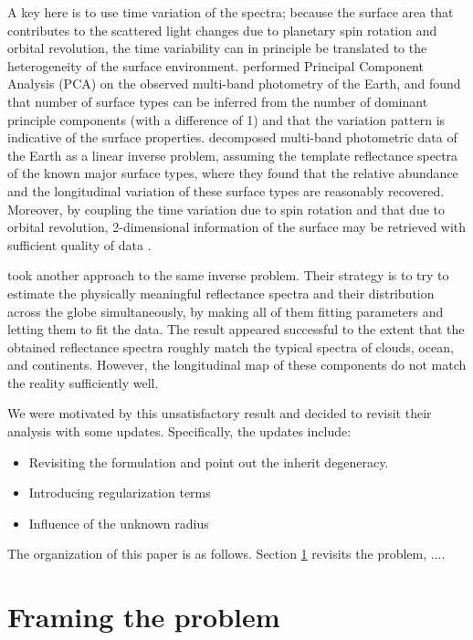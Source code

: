 \documentclass[iop,numberedappendix,apj,]{emulateapj}
\begin{document}
A key here is to use time variation of the spectra; because the surface area that contributes to the scattered light changes due to planetary spin rotation and orbital revolution, the time variability can in principle be translated to the heterogeneity of the surface environment.  
\citet{Cowan2009, Cowan2011} performed Principal Component Analysis (PCA) on the observed multi-band photometry of the Earth, and found that number of surface types can be inferred from the number of dominant principle components (with a difference of 1) and that the variation pattern is indicative of the surface properties. 
\citet{Fujii2010, Fujii2011} decomposed multi-band photometric data of the Earth as a linear inverse problem, assuming the template reflectance spectra of the known major surface types, where they found that the relative abundance and the longitudinal variation of these surface types are reasonably recovered. 
Moreover, by coupling the time variation due to spin rotation and that due to orbital revolution, 2-dimensional information of the surface may be retrieved with sufficient quality of data \citep{Kawahara2010, Kawahara2011, Fujii2012}. 

\citet{Cowan2013} took another approach to the same inverse problem. 
Their strategy is to try to estimate the physically meaningful reflectance spectra and their distribution across the globe simultaneously, by making all of them fitting parameters and letting them to fit the data. 
The result appeared successful to the extent that the obtained reflectance spectra roughly match the typical spectra of clouds, ocean, and continents. 
However, the longitudinal map of these components do not match the reality sufficiently well. 

We were motivated by this unsatisfactory result and decided to revisit their analysis with some updates. 
Specifically, the updates include:
\begin{itemize}
\item Revisiting the formulation and point out the inherit degeneracy. 
\item Introducing regularization terms
\item Influence of the unknown radius
\end{itemize}

The organization of this paper is as follows. 
Section \ref{s:frame} revisits the problem, ....

\section{Framing the problem}
\label{s:frame}
\end{document}
